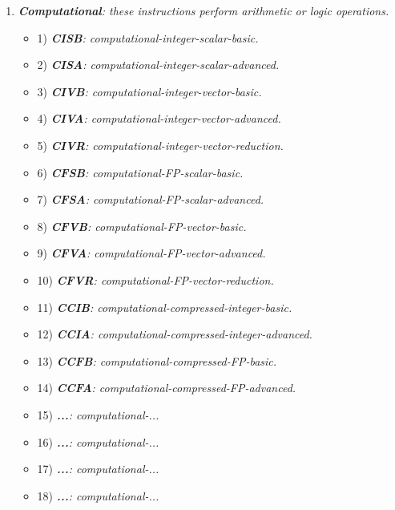         \begin{enumerate}

            \item \textit{\textbf{Computational}: these instructions perform arithmetic or logic operations.}

                \begin{itemize}

                    \item 1) \textit{\textbf{CISB}: computational-integer-scalar-basic.}
                    \item 2) \textit{\textbf{CISA}: computational-integer-scalar-advanced.}

                    \item 3) \textit{\textbf{CIVB}: computational-integer-vector-basic.}
                    \item 4) \textit{\textbf{CIVA}: computational-integer-vector-advanced.}
                    \item 5) \textit{\textbf{CIVR}: computational-integer-vector-reduction.}

                    \item 6) \textit{\textbf{CFSB}: computational-FP-scalar-basic.}
                    \item 7) \textit{\textbf{CFSA}: computational-FP-scalar-advanced.}

                    \item 8) \textit{\textbf{CFVB}: computational-FP-vector-basic.}
                    \item 9) \textit{\textbf{CFVA}: computational-FP-vector-advanced.}
                    \item 10) \textit{\textbf{CFVR}: computational-FP-vector-reduction.}

                    \item 11) \textit{\textbf{CCIB}: computational-compressed-integer-basic.}
                    \item 12) \textit{\textbf{CCIA}: computational-compressed-integer-advanced.}

                    \item 13) \textit{\textbf{CCFB}: computational-compressed-FP-basic.}
                    \item 14) \textit{\textbf{CCFA}: computational-compressed-FP-advanced.}

                    \item 15) \textit{\textbf{...}: computational-...} %
                    \item 16) \textit{\textbf{...}: computational-...}
                    \item 17) \textit{\textbf{...}: computational-...}
                    \item 18) \textit{\textbf{...}: computational-...}


\end{itemize}
\end{enumerate}
